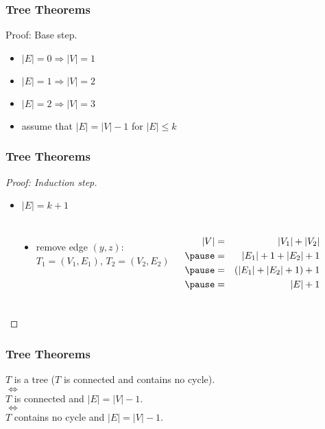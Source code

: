 \documentclass[dvipsnames]{beamer}
\begin{document}
\begin{frame}
  \frametitle{Tree Theorems}

  \begin{block}{Proof: Base step.}
    \begin{itemize}
      \item $|E|=0 \Rightarrow |V|=1$
      \item $|E|=1 \Rightarrow |V|=2$
      \item $|E|=2 \Rightarrow |V|=3$

      \pause
      \medskip
      \item assume that $|E| = |V| - 1$ for $|E| \leq k$
    \end{itemize}
  \end{block}
\end{frame}

\begin{frame}
  \frametitle{Tree Theorems}

  \begin{proof}[Proof: Induction step]
    \begin{itemize}
      \item $|E|=k+1$
    \end{itemize}

    \begin{columns}[t]
      \begin{center}
      \end{center}

      \pause
      \begin{itemize}
        \item remove edge $(y,z)$:\\
          $T_1=(V_1,E_1)$, $T_2=(V_2,E_2)$
      \end{itemize}
      \pause
      \begin{eqnarray*}
        |V| & = & |V_1|+|V_2|\\\pause
            & = & |E_1|+1+|E_2|+1\\\pause
            & = & (|E_1|+|E_2|+1)+1\\\pause
            & = & |E|+1
      \end{eqnarray*}
    \end{columns}
  \end{proof}
\end{frame}

\begin{frame}
  \frametitle{Tree Theorems}

  \begin{theorem}
    \begin{center}
      $T$ is a tree ($T$ is connected and contains no cycle).\\
      $\Leftrightarrow$\\
      $T$ is connected and $|E| = |V| - 1$.\\
      $\Leftrightarrow$\\
      $T$ contains no cycle and $|E| = |V| - 1$.
    \end{center}
  \end{theorem}
\end{frame}
\end{document}
